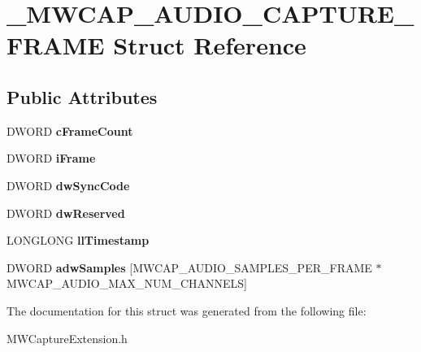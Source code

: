 \hypertarget{struct__MWCAP__AUDIO__CAPTURE__FRAME}{\section{\-\_\-\-M\-W\-C\-A\-P\-\_\-\-A\-U\-D\-I\-O\-\_\-\-C\-A\-P\-T\-U\-R\-E\-\_\-\-F\-R\-A\-M\-E Struct Reference}
\label{struct__MWCAP__AUDIO__CAPTURE__FRAME}
}
\subsection*{Public Attributes}
\begin{DoxyCompactItemize}
\item 
\hypertarget{struct__MWCAP__AUDIO__CAPTURE__FRAME_a04ece744281514862290c1b99c287b59}{D\-W\-O\-R\-D {\bfseries c\-Frame\-Count}}\label{struct__MWCAP__AUDIO__CAPTURE__FRAME_a04ece744281514862290c1b99c287b59}

\item 
\hypertarget{struct__MWCAP__AUDIO__CAPTURE__FRAME_a3d9b4a04cdf37f23a97d686cfc123d0f}{D\-W\-O\-R\-D {\bfseries i\-Frame}}\label{struct__MWCAP__AUDIO__CAPTURE__FRAME_a3d9b4a04cdf37f23a97d686cfc123d0f}

\item 
\hypertarget{struct__MWCAP__AUDIO__CAPTURE__FRAME_af6ae86ea2e06a9e90f6d334f4fd9b7b6}{D\-W\-O\-R\-D {\bfseries dw\-Sync\-Code}}\label{struct__MWCAP__AUDIO__CAPTURE__FRAME_af6ae86ea2e06a9e90f6d334f4fd9b7b6}

\item 
\hypertarget{struct__MWCAP__AUDIO__CAPTURE__FRAME_ac901a6dc8ac3ac0d3ff9e12a3802bae6}{D\-W\-O\-R\-D {\bfseries dw\-Reserved}}\label{struct__MWCAP__AUDIO__CAPTURE__FRAME_ac901a6dc8ac3ac0d3ff9e12a3802bae6}

\item 
\hypertarget{struct__MWCAP__AUDIO__CAPTURE__FRAME_a9c2b45270958f86751b9c31261b4f453}{L\-O\-N\-G\-L\-O\-N\-G {\bfseries ll\-Timestamp}}\label{struct__MWCAP__AUDIO__CAPTURE__FRAME_a9c2b45270958f86751b9c31261b4f453}

\item 
\hypertarget{struct__MWCAP__AUDIO__CAPTURE__FRAME_ab9b2ee3657ba4074d8c33c7b69f34f47}{D\-W\-O\-R\-D {\bfseries adw\-Samples} \mbox{[}M\-W\-C\-A\-P\-\_\-\-A\-U\-D\-I\-O\-\_\-\-S\-A\-M\-P\-L\-E\-S\-\_\-\-P\-E\-R\-\_\-\-F\-R\-A\-M\-E $\ast$M\-W\-C\-A\-P\-\_\-\-A\-U\-D\-I\-O\-\_\-\-M\-A\-X\-\_\-\-N\-U\-M\-\_\-\-C\-H\-A\-N\-N\-E\-L\-S\mbox{]}}\label{struct__MWCAP__AUDIO__CAPTURE__FRAME_ab9b2ee3657ba4074d8c33c7b69f34f47}

\end{DoxyCompactItemize}


The documentation for this struct was generated from the following file\-:\begin{DoxyCompactItemize}
\item 
M\-W\-Capture\-Extension.\-h\end{DoxyCompactItemize}
